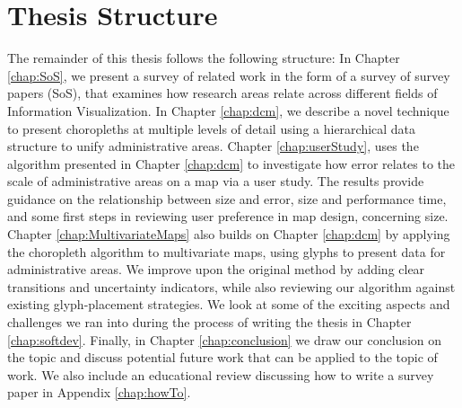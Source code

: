 \section{Thesis Structure}
The remainder of this thesis follows the following structure: In Chapter \ref{chap:SoS}, we present a survey of related work in the form of a survey of survey papers (SoS), that examines how research areas relate across different fields of Information Visualization. In Chapter \ref{chap:dcm}, we describe a novel technique to present choropleths at multiple levels of detail using a hierarchical data structure to unify administrative areas. Chapter \ref{chap:userStudy}, uses the algorithm presented in Chapter \ref{chap:dcm} to investigate how error relates to the scale of administrative areas on a map via a user study. The results provide guidance on the relationship between size and error, size and performance time, and some first steps in reviewing user preference in map design, concerning size. Chapter \ref{chap:MultivariateMaps} also builds on Chapter \ref{chap:dcm} by applying the choropleth algorithm to multivariate maps, using glyphs to present data for administrative areas. We improve upon the original method by adding clear transitions and uncertainty indicators, while also reviewing our algorithm against existing glyph-placement strategies. We look at some of the exciting aspects and challenges we ran into during the process of writing the thesis in Chapter \ref{chap:softdev}. Finally, in Chapter \ref{chap:conclusion} we draw our conclusion on the topic and discuss potential future work that can be applied to the topic of work. We also include an educational review discussing how to write a survey paper in Appendix \ref{chap:howTo}.